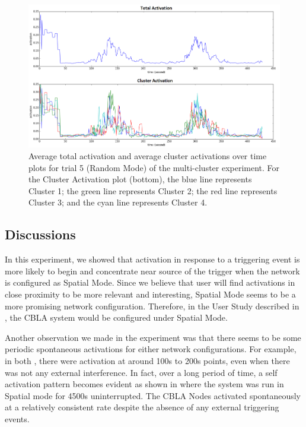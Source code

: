 \begin{figure} [!htbp]
	\centering
	\includegraphics[width=1.0\textwidth]{"fig/validations/cbla_random_2015-11-16_15-14-04 - Metrics"}
	\caption[Average total activation and average cluster activations over time plots for trial 5 (Random Mode) of the multi-cluster experiment]{Average total activation and average cluster activations over time plots for trial 5 (Random Mode) of the multi-cluster experiment. For the Cluster Activation plot (bottom), the blue line represents Cluster 1; the green line represents Cluster 2; the red line represents Cluster 3; and the cyan line represents Cluster 4.}
	\label{fig:multi-cluster-results-random-2}
\end{figure}

\subsection{Discussions}

In this experiment, we showed that activation in response to a triggering event is more likely to begin and concentrate near source of the trigger when the network is configured as Spatial Mode. Since we believe that user will find activations in close proximity to be more relevant and interesting, Spatial Mode seems to be a more promising network configuration. Therefore, in the User Study described in , the CBLA system would be configured under Spatial Mode. 

Another observation we made in the experiment was that there seems to be some periodic spontaneous activations for either network configurations. For example, in both , there were activation at around 100s to 200s points, even when there was not any external interference. In fact, over a long period of time, a self activation pattern becomes evident as shown in  where the system was run in Spatial mode for 4500s uninterrupted. The CBLA Nodes activated spontaneously at a relatively consistent rate despite the absence of any external triggering events. 

